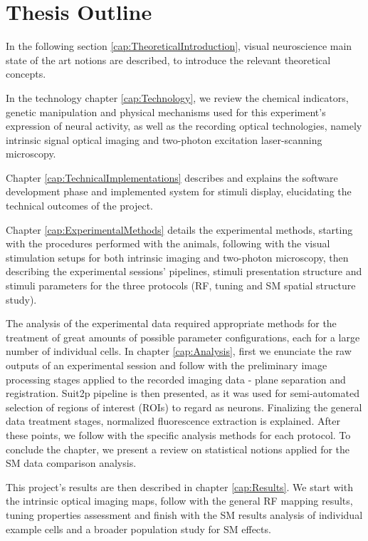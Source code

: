 \section{Thesis Outline}
\label{sec:int_outline}

In the following section \ref{cap:TheoreticalIntroduction}, visual neuroscience main state of the art notions are described, to introduce the relevant theoretical concepts. 

In the technology chapter \ref{cap:Technology}, we review the chemical indicators, genetic manipulation and physical mechanisms used for this experiment's expression of neural activity, as well as the recording optical technologies, namely intrinsic signal optical imaging and two-photon excitation laser-scanning microscopy.

Chapter \ref{cap:TechnicalImplementations} describes and explains the software development phase and implemented system for stimuli display, elucidating the technical outcomes of the project.

Chapter \ref{cap:ExperimentalMethods} details the experimental methods, starting with the procedures performed with the animals, following with the visual stimulation setups for both intrinsic imaging and two-photon microscopy, then describing the experimental sessions' pipelines, stimuli presentation structure and stimuli parameters for the three protocols (RF, tuning and SM spatial structure study).

The analysis of the experimental data required appropriate methods for the treatment of great amounts of possible parameter configurations, each for a large number of individual cells. In chapter \ref{cap:Analysis}, first we enunciate the raw outputs of an experimental session and follow with the preliminary image processing stages applied to the recorded imaging data - plane separation and registration. Suit2p pipeline is then presented, as it was used for semi-automated selection of regions of interest (ROIs) to regard as neurons. Finalizing the general data treatment stages, normalized fluorescence extraction is explained. After these points, we follow with the specific analysis methods for each protocol. To conclude the chapter, we present a review on statistical notions applied for the SM data comparison analysis.

This project's results are then described in chapter \ref{cap:Results}. We start with the intrinsic optical imaging maps, follow with the general RF mapping results, tuning properties assessment and finish with the SM results analysis of individual example cells and a broader population study for SM effects.

